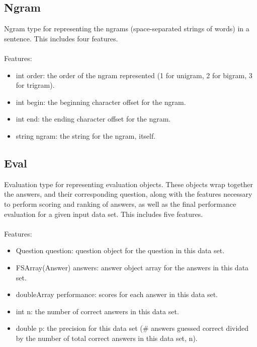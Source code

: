 \documentclass[11pt]{article}
\begin{document}
\subsection{Ngram}
Ngram type for representing the ngrams (space-separated strings of words) in a sentence. This includes four 
features. \\ \\
Features:
\begin{itemize}
\item int order: the order of the ngram represented (1 for unigram, 2 for bigram, 3 for trigram).
\item int begin: the beginning character offset for the ngram.
\item int end: the ending character offset for the ngram.
\item string ngram: the string for the ngram, itself.
\end{itemize}

\subsection{Eval}
Evaluation type for representing evaluation objects. These objects wrap together the answers, and their 
corresponding question, along with the features necessary to perform scoring and ranking of answers, as well
as the final performance evaluation for a given input data set. This includes five features. \\ \\
Features:
\begin{itemize}
\item Question question: question object for the question in this data set.
\item FSArray(Answer) answers: answer object array for the answers in this data set.
\item doubleArray performance: scores for each answer in this data set.
\item int n: the number of correct answers in this data set.
\item double p: the precision for this data set (\# answers guessed correct divided by the number of total 
correct answers in this data set, n).
\end{itemize}
\end{document}
